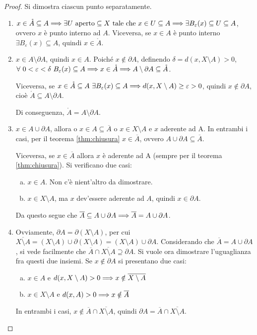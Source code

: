 \begin{proof}
    Si dimostra ciascun punto separatamente.
    \begin{enumerate}
        \item $x \in \mathring A \subseteq A \Longrightarrow \exists U \text{ aperto} \subseteq X \text{ tale che } x \in U \subseteq A \Longrightarrow \exists B_\varepsilon(x) \subseteq U \subseteq A$, ovvero $x$ è punto interno ad $A$. Viceversa, se $x \in A$ è punto interno $\exists B_\varepsilon(x)\subseteq A$, quindi $x \in \mathring A$.
        \item $x \in A\setminus \partial A$, quindi $x \in A$. Poiché $x \notin \partial A$, definendo $\delta = d(x, X\setminus A) > 0$, $\forall \ 0 < \varepsilon < \delta \ B_\varepsilon(x) \subseteq A \then x \in \mathring A \then A \setminus \partial A \subseteq \mathring A$.

        Viceversa, se $x \in \mathring A \subseteq A \ \exists B_\varepsilon(x) \subseteq A \Longrightarrow d(x, X\setminus A) \geq \varepsilon > 0$, quindi $x \notin \partial A$, cioè $\mathring A \subseteq A \setminus \partial A$.

        Di conseguenza, $\mathring A = A \setminus \partial A$.
        \item $x \in A \cup \partial A$, allora o $x \in A \subseteq \overline{A}$ o $x \in X \setminus A$ e $x$ aderente ad A. In entrambi i casi, per il teorema \ref{thm:chiusura} $x \in \overline{A}$, ovvero $A \cup \partial A \subseteq \overline{A}$.

        Viceversa, se $x \in \overline{A}$ allora $x$ è aderente ad A (sempre per il teorema \ref{thm:chiusura}). Si verificano due casi:
        \begin{enumerate}[a.]
            \item $x \in A$. Non c'è nient'altro da dimostrare.
            \item $x \in X \setminus A$, ma $x$ dev'essere aderente ad $A$, quindi $x \in \partial A$.
        \end{enumerate}
        Da questo segue che $\overline{A} \subseteq A \cup \partial A \Longrightarrow \overline{A} = A \cup \partial A$.
        \item Ovviamente, $\partial A = \partial (X \setminus A)$, per cui $\overline{X \setminus A} = (X \setminus A) \cup \partial (X \setminus A) = (X \setminus A) \cup \partial A$. Considerando che $\overline{A} = A \cup \partial A$, si vede facilmente che $\overline{A} \cap \overline{X \setminus A} \supseteq \partial A$. Si vuole ora dimostrare l'uguaglianza fra questi due insiemi. Se $x \notin \partial A$ si presentano due casi:
        \begin{enumerate}[a.]
            \item $x \in A$ e $d(x, X \setminus A) > 0 \Longrightarrow x \notin \overline{X \setminus A}$
            \item $x \in X \setminus A$ e $d(x, A)> 0 \Longrightarrow x \notin \overline{A}$
        \end{enumerate}
        In entrambi i casi, $x \notin \overline{A} \cap \overline{X \setminus A}$, quindi $\partial A = \overline{A} \cap \overline{X \setminus A}$.
        

\end{enumerate}
\end{proof}
